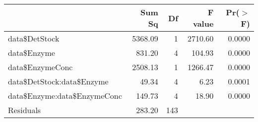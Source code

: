 \begin{table}[ht]
\centering
\begin{tabular}{lrrrr}
  \hline
 & Sum Sq & Df & F value & Pr($>$F) \\ 
  \hline
data\$DetStock & 5368.09 & 1 & 2710.60 & 0.0000 \\ 
  data\$Enzyme & 831.20 & 4 & 104.93 & 0.0000 \\ 
  data\$EnzymeConc & 2508.13 & 1 & 1266.47 & 0.0000 \\ 
  data\$DetStock:data\$Enzyme & 49.34 & 4 & 6.23 & 0.0001 \\ 
  data\$Enzyme:data\$EnzymeConc & 149.73 & 4 & 18.90 & 0.0000 \\ 
  Residuals & 283.20 & 143 &  &  \\ 
   \hline
\end{tabular}
\end{table}
